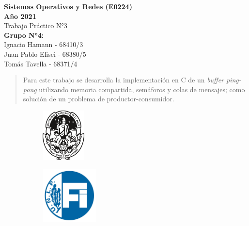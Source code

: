     \begin{titlepage}
        \begin{center}
            \vspace*{0.5cm}
            \huge
            \textbf{Sistemas Operativos y Redes (E0224) \\ Año 2021}    %
            \\
            \vspace{0.5cm}
            Trabajo Práctico N°3                                        %
            \\
            \vspace{2cm}
            \Large
            \textbf{Grupo N°4:}
            \\
            \large
            \vspace{0.2cm}
            Ignacio Hamann - 68410/3
            \\
            Juan Pablo Elisei - 68380/5
            \\
            Tomás Tavella - 68371/4
            \\
            \vspace{2cm}
            \begin{abstract}
                Para este trabajo se desarrolla la implementación en C de un \textit{buffer ping-pong} utilizando memoria compartida, semáforos y colas de mensajes; como solución de un problema de productor-consumidor.
            \end{abstract}
            \vfill
            \begin{figure}[H]
                \centering
                \begin{subfigure}
                    \centering
                    \includegraphics[width=0.25\textwidth]{Imagenes/UNLP.pdf}
                \end{subfigure}
                \begin{subfigure}
                    \centering
                    \includegraphics[width=0.32\textwidth]{Imagenes/FI.jpg}

\end{subfigure}
\end{figure}
\end{center}
\end{titlepage}
